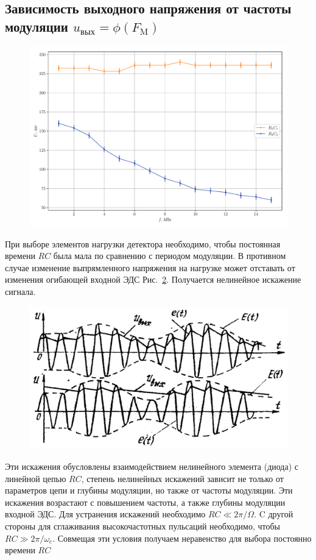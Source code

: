 \subsection{Зависимость выходного напряжения от частоты модуляции  $u_{\text{вых}} = \phi(F_{\text{M}})$}
\begin{figure}
	\centering
	\includegraphics[width=0.8\linewidth]{plots/exp3b.pdf}
	\caption{}
	\label{exp:3.3}
\end{figure}
При выборе элементов нагрузки детектора необходимо, чтобы постоянная времени $RC$ была мала по сравнению с периодом модуляции. В противном случае изменение выпрямленного напряжения на нагрузке может отставать от изменения огибающей входной ЭДС Рис.~\ref{pic:11}. Получается нелинейное искажение сигнала. 
\begin{figure}[h!]
	\centering
	\includegraphics[width=0.8\linewidth]{picture/pic11.jpg}
	\caption{}
	\label{pic:11}
\end{figure}
Эти искажения обусловлены взаимодействием нелинейного элемента (диода) с линейной цепью $RC$, степень нелинейных искажений зависит не только от параметров цепи и глубины модуляции, но также от частоты модуляции. Эти искажения возрастают с повышением частоты, а также глубины модуляции входной ЭДС. Для устранения искажений необходимо $RC\ll2\pi/\Omega$. C другой стороны для сглаживания высокочастотных пульсаций необходимо, чтобы $RC\gg2\pi/\omega_c$. Совмещая эти условия получаем неравенство для выбора постоянно времени $RC$
